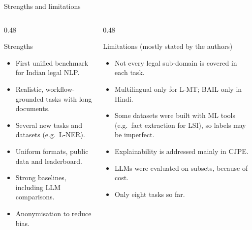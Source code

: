 \documentclass[aspectratio=169,11pt]{beamer}
\begin{document}
\begin{frame}{Strengths and limitations}
  \begin{columns}[T]
    \begin{column}{0.48\textwidth}
      \begin{exampleblock}{Strengths}
        \small
        \begin{itemize}
          \item First unified benchmark for Indian legal NLP.
          \item Realistic, workflow-grounded tasks with long documents.
          \item Several new tasks and datasets (e.g.\ L-NER).
          \item Uniform formats, public data and leaderboard.
          \item Strong baselines, including LLM comparisons.
          \item Anonymisation to reduce bias.
        \end{itemize}
      \end{exampleblock}
    \end{column}
    \begin{column}{0.48\textwidth}
      \begin{alertblock}{Limitations (mostly stated by the authors)}
        \small
        \begin{itemize}
          \item Not every legal sub-domain is covered in each task.
          \item Multilingual only for L-MT; BAIL only in Hindi.
          \item Some datasets were built with ML tools (e.g.\ fact extraction for LSI), so labels may be imperfect.
          \item Explainability is addressed mainly in CJPE.
          \item LLMs were evaluated on subsets, because of cost.
          \item Only eight tasks so far.
        \end{itemize}
      \end{alertblock}
    \end{column}
  \end{columns}
\end{frame}
\end{document}
